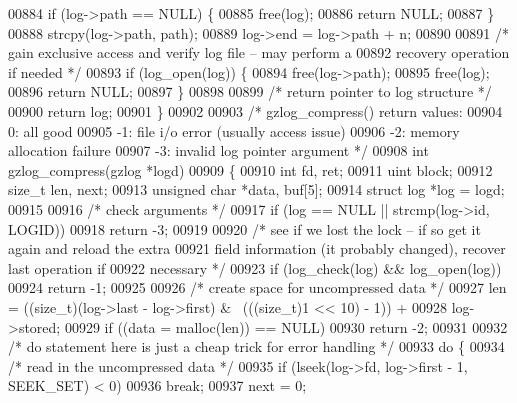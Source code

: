 \begin{DoxyCode}
{00884     \textcolor{keywordflow}{if} (log->path == NULL) \{
00885         free(log);
00886         \textcolor{keywordflow}{return} NULL;
00887     \}
00888     strcpy(log->path, path);
00889     log->end = log->path + n;
00890 
00891     \textcolor{comment}{/* gain exclusive access and verify log file -- may perform a}
00892 \textcolor{comment}{       recovery operation if needed */}
00893     \textcolor{keywordflow}{if} (log\_open(log)) \{
00894         free(log->path);
00895         free(log);
00896         \textcolor{keywordflow}{return} NULL;
00897     \}
00898 
00899     \textcolor{comment}{/* return pointer to log structure */}
00900     \textcolor{keywordflow}{return} log;
00901 \}
00902 
00903 \textcolor{comment}{/* gzlog\_compress() return values:}
00904 \textcolor{comment}{    0: all good}
00905 \textcolor{comment}{   -1: file i/o error (usually access issue)}
00906 \textcolor{comment}{   -2: memory allocation failure}
00907 \textcolor{comment}{   -3: invalid log pointer argument */}
00908 \textcolor{keywordtype}{int} gzlog\_compress(gzlog *logd)
00909 \{
00910     \textcolor{keywordtype}{int} fd, ret;
00911     uint block;
00912     \textcolor{keywordtype}{size\_t} len, next;
00913     \textcolor{keywordtype}{unsigned} \textcolor{keywordtype}{char} *data, buf[5];
00914     \textcolor{keyword}{struct }log *log = logd;
00915 
00916     \textcolor{comment}{/* check arguments */}
00917     \textcolor{keywordflow}{if} (log == NULL || strcmp(log->id, LOGID))
00918         \textcolor{keywordflow}{return} -3;
00919 
00920     \textcolor{comment}{/* see if we lost the lock -- if so get it again and reload the extra}
00921 \textcolor{comment}{       field information (it probably changed), recover last operation if}
00922 \textcolor{comment}{       necessary */}
00923     \textcolor{keywordflow}{if} (log\_check(log) && log\_open(log))
00924         \textcolor{keywordflow}{return} -1;
00925 
00926     \textcolor{comment}{/* create space for uncompressed data */}
00927     len = ((size\_t)(log->last - log->first) & ~(((size\_t)1 << 10) - 1)) +
00928           log->stored;
00929     \textcolor{keywordflow}{if} ((data = malloc(len)) == NULL)
00930         \textcolor{keywordflow}{return} -2;
00931 
00932     \textcolor{comment}{/* do statement here is just a cheap trick for error handling */}
00933     \textcolor{keywordflow}{do} \{
00934         \textcolor{comment}{/* read in the uncompressed data */}
00935         \textcolor{keywordflow}{if} (lseek(log->fd, log->first - 1, SEEK\_SET) < 0)
00936             \textcolor{keywordflow}{break};
00937         next = 0;
}
\end{DoxyCode}
